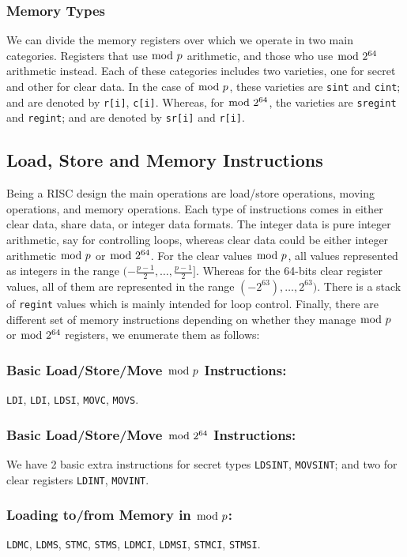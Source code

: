 \subsubsection{Memory Types}

We can divide the memory registers over which we operate in two main categories. Registers that use $\bmod \; p$ arithmetic, and those who use $\bmod \; 2^{64}$ arithmetic instead. 
Each of these categories includes two varieties, one for secret and other for clear data. 
In the case of $\bmod \; p$, these varieties are \verb+sint+ and \verb+cint+; and are denoted by \verb+r[i]+, \verb+c[i]+. Whereas, for $\bmod \; 2^{64}$, the varieties are \verb+sregint+ and
\verb+regint+; and are denoted by \verb+sr[i]+ and \verb+r[i]+.

\subsection{Load, Store and Memory Instructions}
Being a RISC design the main operations are load/store
operations, moving operations, and memory operations.
Each type of instructions comes in either clear data, 
share data, or integer data formats. 
The integer data is pure integer arithmetic, say
for controlling loops, whereas clear data could be either integer
arithmetic $\bmod \; p$ or $\bmod \; 2^{64}$.
For the clear values  $\bmod \; p$, all values represented as integers 
in the range $(-\frac{p-1}{2}, \dots, \frac{p-1}{2}]$. 
Whereas for the 64-bits clear register values, all of them are represented 
in the range $(-2^{63}), \dots, 2^{63})$.
There is a stack of \verb+regint+ values which is mainly intended for loop
control.
Finally, there are different set of memory instructions depending on whether they manage $\bmod \; p$ or $\bmod \; 2^{64}$ registers, we enumerate them as follows:

\subsubsection{Basic Load/Store/Move  $\bmod \; p$ Instructions:}
\verb+LDI+,
\verb+LDI+,
\verb+LDSI+,
\verb+MOVC+,
\verb+MOVS+.


\subsubsection{Basic Load/Store/Move $\bmod \; 2^{64}$ Instructions:}
We have 2 basic extra instructions for secret types \verb+LDSINT+,
\verb+MOVSINT+; and two for clear registers \verb+LDINT+, \verb+MOVINT+.


\subsubsection{Loading to/from Memory in $\bmod \; p$:}
 \verb+LDMC+,
 \verb+LDMS+,
 \verb+STMC+,
 \verb+STMS+,
 \verb+LDMCI+,
 \verb+LDMSI+,
 \verb+STMCI+,
 \verb+STMSI+.

